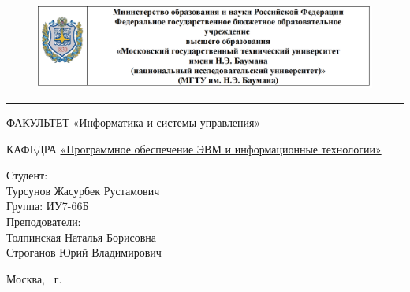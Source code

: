 \documentclass[a4paper, 12pt]{article}
\begin{document}
	
\begin{titlepage}
	\fontsize{12pt}{12pt}\selectfont
	\begin{figure}[t!]
		\centering
		\includegraphics[scale=0.8]{bmstu}
	\end{figure}
	
	\noindent\rule{15cm}{3pt}
	\newline\newline
	\noindent 
	ФАКУЛЬТЕТ 
	\underline{«Информатика и системы управления»} \newline\newline
	
	\noindent КАФЕДРА \underline{«Программное обеспечение ЭВМ и информационные технологии»}\newline\newline\newline\newline\newline
	
	\vspace{1mm}
	
	\vspace{8mm}
	
	
	\begin{flushright}
		{\small	Студент:\\ Турсунов Жасурбек Рустамович \\ Группа: ИУ7-66Б
			\vspace{3mm}
			\\Преподователи: \\ Толпинская Наталья Борисовна \\ Строганов Юрий Владимирович}
	\end{flushright}
	
	\begin{center}
		\vfill
		Москва, \the\year
		~г.
	\end{center}
\end{titlepage}
\end{document}
